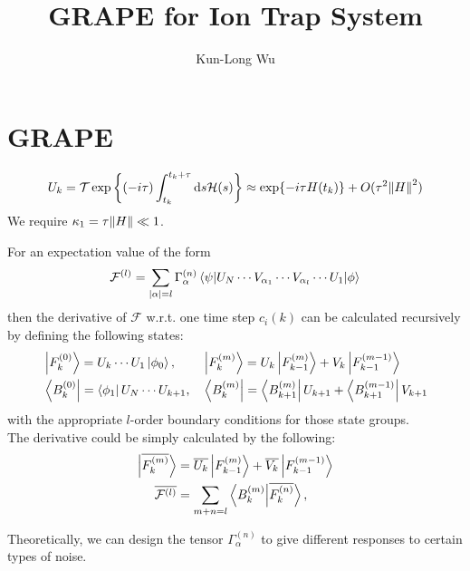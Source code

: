 \documentclass{notes2}
\title{GRAPE for Ion Trap System}
\author{Kun-Long Wu}
\newcommand{\dvbar}[1]{\overline{#1}}
\begin{document}
\maketitle
\tableofcontents

\newpage
\section{GRAPE}
\begin{align*}
    U_k = \mathcal{T}\exp\left\{(-i\tau)\int_{t_k}^{t_k+\tau}\dd s\mathcal{H}(s)\right\} \approx \exp\{-i\tau H(t_k)\} + O(\tau^2 \norm{H}^2) \\
\end{align*}
We require $\kappa_1 = \tau \norm{H}\ll 1$.
\begin{lemma}
    For an expectation value of the form
    \begin{equation}
        \mathcal{F}^{(l)} = \sum_{\abs{\alpha}=l} \Gamma^{(n)}_{\alpha}\mel{\psi}{U_N\cdots V_{\alpha_1} \cdots V_{\alpha_l} \cdots U_1}{\phi}
    \end{equation}
    then the derivative of $\mathcal{F}$ w.r.t. one time step $c_i(k)$ can be calculated recursively by defining the following states:
    \begin{align*}
        &\ket{F^{(0)}_k} = U_k\cdots U_1\ket{\phi_0}, &&\ket{F^{(m)}_k} = U_k\ket{F^{(m)}_{k-1}} + V_k\ket{F^{(m-1)}_{k-1}}\\
        &\bra{B^{(0)}_k} = \bra{\phi_1}U_N\cdots U_{k+1}, &&\bra{B^{(m)}_k} = \bra{B^{(m)}_{k+1}}U_{k+1} + \bra{B^{(m-1)}_{k+1}}V_{k+1}
    \end{align*}
    with the appropriate $l$-order boundary conditions for those state groups.\\
    The derivative could be simply calculated by the following:
    \begin{align*}
        \ket{\dvbar{F_k^{(m)}}} &= \dvbar{U_k}\ket{F^{(m)}_{k-1}} + \dvbar{V_k}\ket{F^{(m-1)}_{k-1}}\\
        \dvbar{\mathcal{F}^{(l)}} &= \sum_{m+n=l}\braket{B_k^{(m)}}{\dvbar{F_k^{(n)}}},
    \end{align*}
\end{lemma}
Theoretically, we can design the tensor $\Gamma^{(n)}_\alpha$ to give different responses to certain types of noise.
\end{document}
